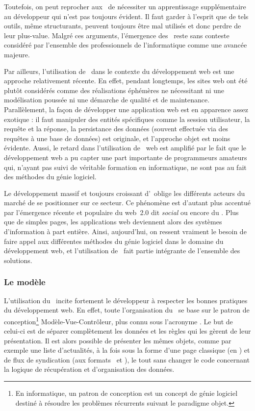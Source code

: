 Toutefois, on peut reprocher aux \afms\ de nécessiter un apprentissage supplémentaire au développeur qui n'est pas toujours évident. Il faut garder à l'esprit que de tels outils, même structurants, peuvent toujours être mal utilisés et donc perdre de leur plus-value. Malgré ces arguments, l'émergence des \afms\ reste sans conteste considéré par l'ensemble des professionnels de l'informatique comme une avancée majeure.

Par ailleurs, l'utilisation de \afms\ dans le contexte du développement web est une approche relativement récente. En effet, pendant longtemps, les sites web ont été plutôt considérés comme des réalisations éphémères ne nécessitant ni une modélisation poussée ni une démarche de qualité et de maintenance. Parallèlement, la façon de développer une application web est en apparence assez exotique : il faut manipuler des entités spécifiques comme la session utilisateur, la requête et la réponse, la persistance des données (souvent effectuée via des requêtes à une base de données) est originale, et l'approche objet est moins évidente. Aussi, le retard dans l'utilisation de \afms\ web est amplifié par le fait que le développement web a pu capter une part importante de programmeurs amateurs qui, n'ayant pas suivi de véritable formation en informatique, ne sont pas au fait des méthodes du génie logiciel.

Le développement massif et toujours croissant d'\ainternet\ oblige les différents acteurs du marché de se positionner sur ce secteur. Ce phénomène est d'autant plus accentué par l'émergence récente et populaire du web~2.0\cite{webdeux} dit \emph{social} ou encore du \acloud\cite{cloud}. Plus que de simples pages, les applications web deviennent alors des systèmes d'information à part entière. Ainsi, aujourd'hui, on ressent vraiment le besoin de faire appel aux différentes méthodes du génie logiciel dans le domaine du développement web, et l'utilisation de \afm\ fait partie intégrante de l'ensemble des solutions.


\subsubsection{Le modèle \amvc}

L'utilisation du \asf\ incite fortement le développeur à respecter les bonnes pratiques du développement web. En effet, toute l'organisation du \afm\ se base sur le patron de conception\footnote{En informatique, un patron de conception est un concept de génie logiciel destiné à résoudre les problèmes récurrents suivant le paradigme objet.\cite{designpattern}} Modèle-Vue-Contrôleur, plus connu sous l'acronyme \amvc. Le but de celui-ci est de séparer complètement les données et les
règles qui les gèrent de leur présentation. Il est alors possible de présenter les mêmes objets, comme par exemple une liste d'actualités, à la fois sous la forme d'une page classique (en \ahtml) et de flux de syndication (aux formats \arss\ et \aatom), le tout sans changer le code concernant la logique de récupération et d'organisation des données.

